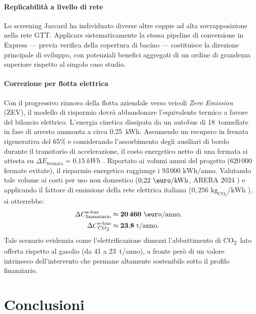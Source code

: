 \documentclass[conference]{IEEEtran}
\newcommand{\co}{CO\textsubscript{2}}
\begin{document}
\paragraph{Replicabilità a livello di rete}
Lo screening Jaccard ha individuato diverse altre coppie ad alta sovrapposizione nella rete GTT. Applicare sistematicamente la stessa pipeline di conversione in Express --- previa verifica della copertura di bacino --- costituisce la direzione principale di sviluppo, con potenziali benefici aggregati di un ordine di grandezza superiore rispetto al singolo caso studio.

\paragraph{Correzione per flotta elettrica}
Con il progressivo rinnovo della flotta aziendale verso veicoli \textit{Zero Emission} (ZEV), il modello di risparmio dovrà abbandonare l'equivalente termico a favore del bilancio elettrico. L'energia cinetica dissipata da un autobus di 18~tonnellate in fase di arresto ammonta a circa \SI{0.25}{kWh}. Assumendo un recupero in frenata rigenerativa del 65\% e considerando l'assorbimento degli ausiliari di bordo durante il transitorio di accelerazione, il costo energetico netto di una fermata si attesta su $\Delta E_\text{fermata} = \SI{0,15}{kWh}$ \cite{nrel_ebus}.
Riportato ai volumi annui del progetto ($620\,000$ fermate evitate), il risparmio energetico raggiunge i $93\,000 \text{ kWh/anno}$. Valutando tale volume ai costi per uso non domestico ($0{,}22 \text{ \euro/kWh}$, ARERA 2024 \cite{arera_2024}) e applicando il fattore di emissione della rete elettrica italiana ($0{,}256 \text{ kg}_{\text{CO}_2}\text{/kWh}$ \cite{ispra2023}), si otterrebbe:
\begin{align}
  \Delta C_{\text{finanziario}}^\text{e-bus} &\approx \mathbf{ 20\,460 \text{ \euro/anno}}, \\
  \Delta C_{\co}^\text{e-bus} &\approx \mathbf{ 23{,}8 \text{ t/anno}}.
\end{align}
Tale scenario evidenzia come l'elettrificazione dimezzi l'abbattimento di \co\ lato offerta rispetto al gasolio (da 41 a 23~t/anno), a fronte però di un valore intrinseco dell'intervento che permane altamente sostenibile sotto il profilo finanziario.

\section{Conclusioni}
\label{sec:conclusion}
\end{document}
